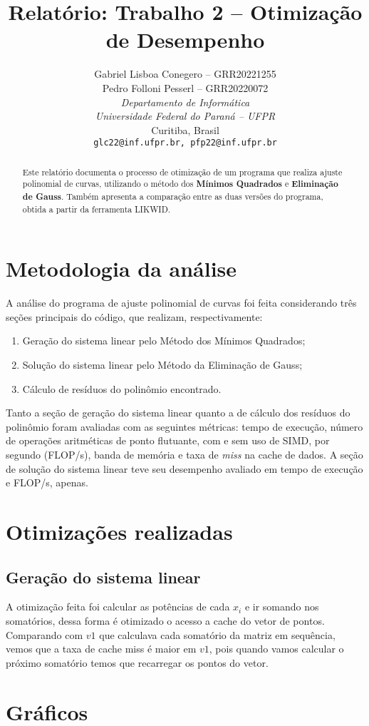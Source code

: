 \documentclass[a4paper, 11pt]{article}
\title{Relatório: Trabalho 2 -- Otimização de Desempenho}
\author{Gabriel Lisboa Conegero -- GRR20221255\\
Pedro Folloni Pesserl -- GRR20220072\\
\textit{Departamento de Informática}\\
\textit{Universidade Federal do Paraná -- UFPR}\\
Curitiba, Brasil\\
\texttt{glc22@inf.ufpr.br, pfp22@inf.ufpr.br}}
\date{}
\begin{document}
\maketitle

\begin{abstract}
\begin{singlespace}
    Este relatório documenta o processo de otimização de um programa que
    realiza ajuste polinomial de curvas, utilizando o método dos
    \textbf{Mínimos Quadrados} e \textbf{Eliminação de Gauss}. Também
    apresenta a comparação entre as duas versões do programa, obtida a
    partir da ferramenta LIKWID.
\end{singlespace}
\end{abstract}

\section{Metodologia da análise}
A análise do programa de ajuste polinomial de curvas foi feita considerando
três seções principais do código, que realizam, respectivamente:
\begin{enumerate}
    \item Geração do sistema linear pelo Método dos Mínimos Quadrados;
    \item Solução do sistema linear pelo Método da Eliminação de Gauss;
    \item Cálculo de resíduos do polinômio encontrado.
\end{enumerate}
Tanto a seção de geração do sistema linear quanto a de cálculo dos resíduos do
polinômio foram avaliadas com as seguintes métricas: tempo de execução, número
de operações aritméticas de ponto flutuante, com e sem uso de SIMD, por segundo
(FLOP/s), banda de memória e taxa de \textit{miss} na cache de dados. A seção de
solução do sistema linear teve seu desempenho avaliado em tempo de execução e
FLOP/s, apenas.

\section{Otimizações realizadas}
\subsection{Geração do sistema linear}
A otimização feita foi calcular as potências de cada $x_i$ e ir somando nos
somatórios, dessa forma é otimizado o acesso a cache do vetor de pontos.
Comparando com $v1$ que calculava cada somatório da matriz em sequência, vemos
que a taxa de cache miss é maior em $v1$, pois quando vamos calcular o próximo
somatório temos que recarregar os pontos do vetor.

\section{Gráficos}
\end{document}
